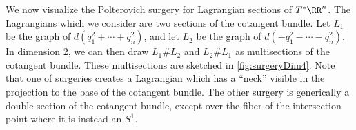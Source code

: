 

We now visualize the Polterovich surgery for Lagrangian sections of $T^*\RR^n$.
The Lagrangians which we consider are two sections of the cotangent bundle. 
Let $L_1$ be the graph of $d(q_1^2+ \cdots+ q_n^2)$, and let $L_2$ be the graph of $d(-q_1^2-\cdots -q_n^2)$. 
In dimension 2, we can then draw $L_1\# L_2$ and $L_2\# L_1$ as multisections of the cotangent bundle. 
These multisections are sketched in \cref{fig:surgeryDim4}.
Note that one of surgeries creates a Lagrangian which has a ``neck'' visible in the projection to the base of the cotangent bundle.
The other surgery is generically a double-section of the cotangent bundle, except over the fiber of the intersection point where it is instead an $S^1$.





 